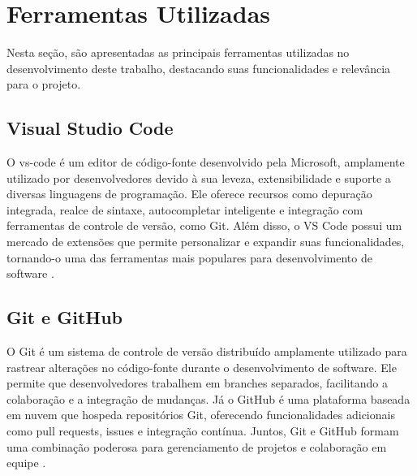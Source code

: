 \section{Ferramentas Utilizadas}
Nesta seção, são apresentadas as principais ferramentas utilizadas no desenvolvimento deste trabalho, destacando suas funcionalidades e relevância para o projeto.

\subsection{Visual Studio Code}
O \gls{vs-code} é um editor de código-fonte desenvolvido pela Microsoft, amplamente utilizado por desenvolvedores devido à sua leveza, extensibilidade e suporte a diversas linguagens de programação. Ele oferece recursos como depuração integrada, realce de sintaxe, autocompletar inteligente e integração com ferramentas de controle de versão, como Git. Além disso, o VS Code possui um mercado de extensões que permite personalizar e expandir suas funcionalidades, tornando-o uma das ferramentas mais populares para desenvolvimento de software \citep{vscode}.

\subsection{Git e GitHub}
O Git é um sistema de controle de versão distribuído amplamente utilizado para rastrear alterações no código-fonte durante o desenvolvimento de software. Ele permite que desenvolvedores trabalhem em branches separados, facilitando a colaboração e a integração de mudanças. Já o GitHub é uma plataforma baseada em nuvem que hospeda repositórios Git, oferecendo funcionalidades adicionais como pull requests, issues e integração contínua. Juntos, Git e GitHub formam uma combinação poderosa para gerenciamento de projetos e colaboração em equipe \cite{git,github}.

